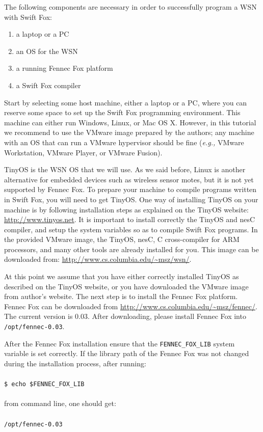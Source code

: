 The following components are necessary in order to successfully program a
WSN with Swift Fox:

\begin{enumerate}
	\item a laptop or a PC
	\item an OS for the WSN
	\item a running Fennec Fox platform
	\item a Swift Fox compiler
\end{enumerate}

Start by selecting some host machine, either a laptop or a PC, where you
can reserve some space to set up the Swift Fox programming environment.
This machine can either run Windows, Linux, or Mac OS X. However, in this
tutorial we recommend to use the VMware image prepared by the authors; any
machine with an OS that can run a VMware hypervisor should be fine
(\textit{e.g.,} VMware Workstation, VMware Player, or VMware Fusion).

TinyOS is the WSN OS that we will use. As we said before, Linux is another 
alternative for embedded devices such as wireless sensor motes, but it is
not yet supported by Fennec Fox. To prepare your machine to compile
programs written in Swift Fox, you will need to get TinyOS. One way of
installing TinyOS on your machine is by following installation steps as
explained on the TinyOS website: \url{http://www.tinyos.net}. It is
important to install correctly the TinyOS and nesC compiler, and setup the
system variables so as to compile Swift Fox programs. In the provided
VMware image, the TinyOS, nesC, C cross-compiler for ARM processors, 
and many other tools are already installed for you. This image can be
downloaded from: \url{http://www.cs.columbia.edu/~msz/wsn/}.

At this point we assume that you have either correctly installed TinyOS as
described on the TinyOS website, or you have downloaded the VMware image
from author's website. The next step is to install the Fennec Fox platform.
Fennec Fox can be downloaded from \url{http://www.cs.columbia.edu/~msz/fennec/}.
The current version is 0.03. After downloading, please install Fennec Fox 
into \texttt{/opt/fennec-0.03}.   

After the Fennec Fox installation ensure that the
\texttt{FENNEC\_FOX\_LIB} system variable is set correctly. If the
library path of the Fennec Fox was not changed during the installation
process, after running:	\\
\\
\texttt{\$ echo \$FENNEC\_FOX\_LIB}					\\
\\
from command line, one should get:					\\
\\
\texttt{/opt/fennec-0.03}						\\

